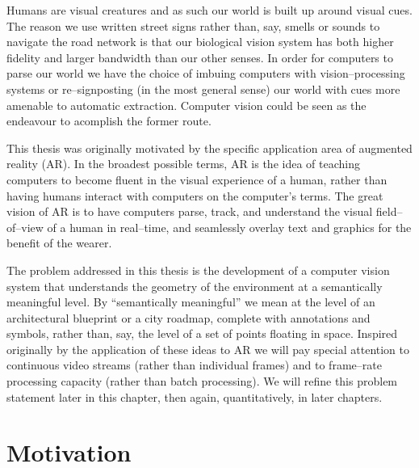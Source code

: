 
Humans are visual creatures and as such our world is built up around
visual cues. The reason we use written street signs rather than, say,
smells or sounds to navigate the road network is that our biological
vision system has both higher fidelity and larger bandwidth than our
other senses. In order for computers to parse our world we have the
choice of imbuing computers with vision--processing systems or
re--signposting (in the most general sense) our world with cues more
amenable to automatic extraction. Computer vision could be seen as the
endeavour to acomplish the former route.

This thesis was originally motivated by the specific application area
of augmented reality (AR). In the broadest possible terms, AR is the
idea of teaching computers to become fluent in the visual experience
of a human, rather than having humans interact with computers on
the computer's terms. The great vision of AR is to have computers
parse, track, and understand the visual field--of--view of a human in
real--time, and seamlessly overlay text and graphics for the benefit
of the wearer.

The problem addressed in this thesis is the development of a computer
vision system that understands the geometry of the environment at a
semantically meaningful level. By ``semantically meaningful'' we mean
at the level of an architectural blueprint or a city roadmap, complete
with annotations and symbols, rather than, say, the level of a set of
points floating in space. Inspired originally by the application of
these ideas to AR we will pay special attention to continuous video
streams (rather than individual frames) and to frame--rate processing
capacity (rather than batch processing). We will refine this problem
statement later in this chapter, then again, quantitatively, in later
chapters.


\section{Motivation}


